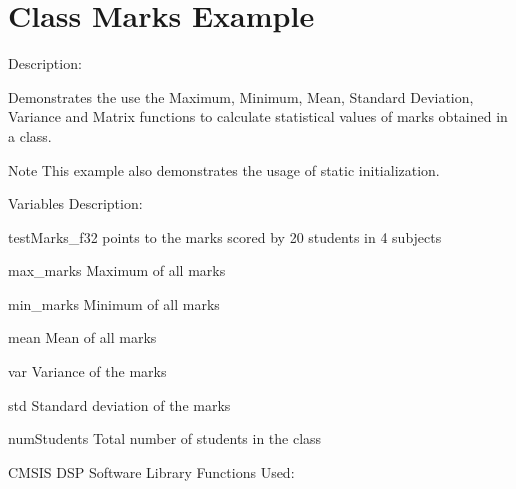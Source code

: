 \hypertarget{group___class_marks}{\section{Class Marks Example}
\label{group___class_marks}
}
\begin{DoxyParagraph}{Description\-: }

\end{DoxyParagraph}
\begin{DoxyParagraph}{}
Demonstrates the use the Maximum, Minimum, Mean, Standard Deviation, Variance and Matrix functions to calculate statistical values of marks obtained in a class.
\end{DoxyParagraph}
\begin{DoxyNote}{Note}
This example also demonstrates the usage of static initialization.
\end{DoxyNote}
\begin{DoxyParagraph}{Variables Description\-:}

\end{DoxyParagraph}
\begin{DoxyParagraph}{}
\begin{DoxyItemize}
\item {\ttfamily test\-Marks\-\_\-f32} points to the marks scored by 20 students in 4 subjects \item {\ttfamily max\-\_\-marks} Maximum of all marks \item {\ttfamily min\-\_\-marks} Minimum of all marks \item {\ttfamily mean} Mean of all marks \item {\ttfamily var} Variance of the marks \item {\ttfamily std} Standard deviation of the marks \item {\ttfamily num\-Students} Total number of students in the class\end{DoxyItemize}

\end{DoxyParagraph}
\begin{DoxyParagraph}{C\-M\-S\-I\-S D\-S\-P Software Library Functions Used\-:}

\end{DoxyParagraph}
